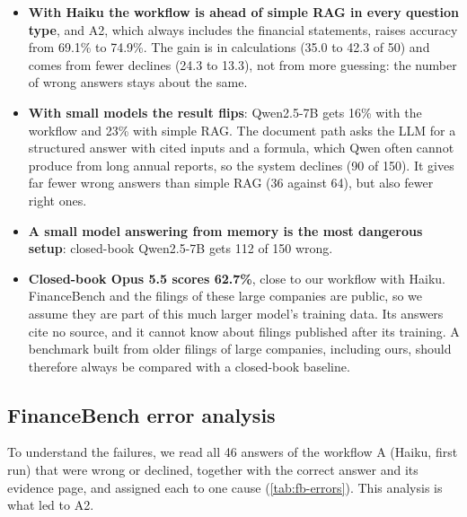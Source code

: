 \begin{itemize}
  \item \textbf{With Haiku the workflow is ahead of simple RAG in every question type}, and A2, which
        always includes the financial statements, raises accuracy from 69.1\% to 74.9\%. The gain is in
        calculations (35.0 to 42.3 of 50) and comes from fewer declines (24.3 to 13.3), not from more
        guessing: the number of wrong answers stays about the same.
  \item \textbf{With small models the result flips}: Qwen2.5-7B gets 16\% with the workflow and 23\%
        with simple RAG. The document path asks the LLM for a structured answer with cited inputs and a
        formula, which Qwen often cannot produce from long annual reports, so the system declines (90
        of 150). It gives far fewer wrong answers than simple RAG (36 against 64), but also fewer
        right ones.
  \item \textbf{A small model answering from memory is the most dangerous setup}: closed-book
        Qwen2.5-7B gets 112 of 150 wrong.
  \item \textbf{Closed-book Opus 5.5 scores 62.7\%}, close to our workflow with Haiku. FinanceBench
        and the filings of these large companies are public, so we assume they are part of this
        much larger model's training data. Its answers cite no source, and it cannot know about
        filings published after its training. A benchmark built from older filings of large companies,
        including ours, should therefore always be compared with a closed-book baseline.
\end{itemize}

\subsection{FinanceBench error analysis}
\label{sec:fb-errors}

To understand the failures, we read all 46 answers of the workflow A (Haiku, first run) that were wrong
or declined, together with the correct answer and its evidence page, and assigned each to one cause
(\cref{tab:fb-errors}). This analysis is what led to A2.

